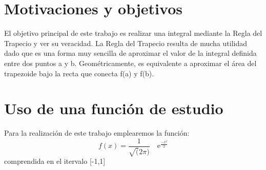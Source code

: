

\section{Motivaciones y objetivos}
\label{1:sec:1}

El objetivo principal de este trabajo es realizar una integral mediante la Regla del Trapecio y ver
su veracidad. La Regla del Trapecio resulta de mucha utilidad dado que es una forma muy sencilla de
aproximar el valor de la integral definida entre dos puntos a y b. Geométricamente, es equivalente a
aproximar el área del  trapezoide bajo la recta que conecta f(a) y f(b).

\section{Uso de una funci\'on de estudio}
\label{1:sec:2}

Para la realización de este trabajo emplearemos la función:
\[
f(x)=\frac{1}{\sqrt(2\pi)} \quad\text{e}^{\frac{-x^2}{2}}
\]
comprendida en el itervalo [-1,1]
